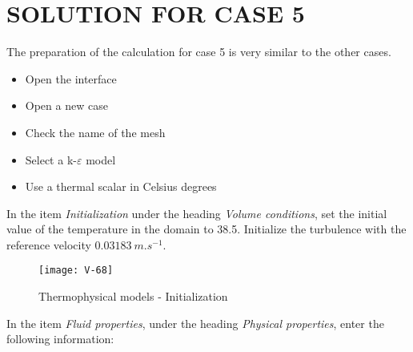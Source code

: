 
%
%
%
%


\section{SOLUTION FOR CASE 5}
The preparation of the calculation for case 5 is very similar to the other cases.
\begin{itemize}
        \item Open the \CS interface
        \item Open a new case
        \item Check the name of the mesh
        \item Select a k-$\varepsilon$ model
        \item Use a thermal scalar in Celsius degrees
\end{itemize}

In the item {\itshape Initialization} under the heading {\itshape Volume conditions}, set the initial value of the temperature
in the domain to 38.5\degresC. Initialize the turbulence with the reference
velocity $0.03183\ m.s^{-1}$.

\begin{figure}[h!]
\begin{center}
\texttt{[image: V-68]}
\caption{Thermophysical models - Initialization}
\label{fig1_e5}
\end{center}
\end{figure}


\newpage
In the item {\itshape Fluid properties}, under the heading {\itshape Physical
properties}, enter the following information:

